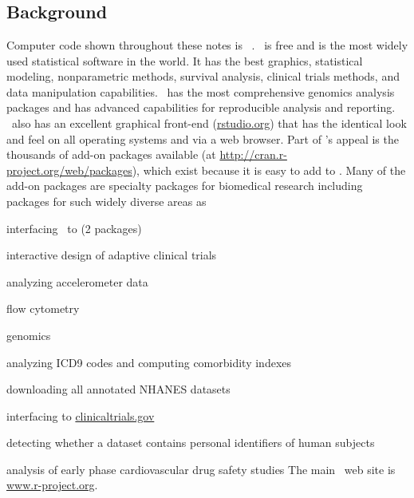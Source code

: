 

\chapter{\R}
\section{Background}
Computer code shown throughout these notes is \R~\cite{R}.  \R\ is free
and is the 
most widely used statistical software in the world.  It has the best graphics,
statistical modeling, nonparametric methods, survival analysis,
clinical trials methods, and data manipulation capabilities.  \R\ has
the most comprehensive genomics analysis packages and has advanced
capabilities for reproducible analysis and reporting.  \R\ also has an
excellent graphical front-end  (\href{https://www.rstudio.com/}{rstudio.org}) that
has the identical look and feel on all operating systems and via a web
browser.  Part of
\R's appeal is the thousands of add-on packages available (at
\url{http://cran.r-project.org/web/packages}), which 
exist because it is easy to add to \R.  Many of the add-on packages
are specialty packages for biomedical research including packages for
such widely diverse areas as
\bi
\item interfacing \R\ to  (2 packages)
\item interactive design of adaptive clinical trials
\item analyzing accelerometer data
\item flow cytometry
\item genomics
\item analyzing ICD9 codes and computing comorbidity indexes
\item downloading all annotated NHANES datasets
\item interfacing to \href{https://clinicaltrials.gov/}{clinicaltrials.gov}
\item detecting whether a dataset contains personal identifiers of
  human subjects
\item analysis of early phase cardiovascular drug safety studies
\ei
The main \R\ web site is \href{https://www.r-project.org/}{www.r-project.org}.

